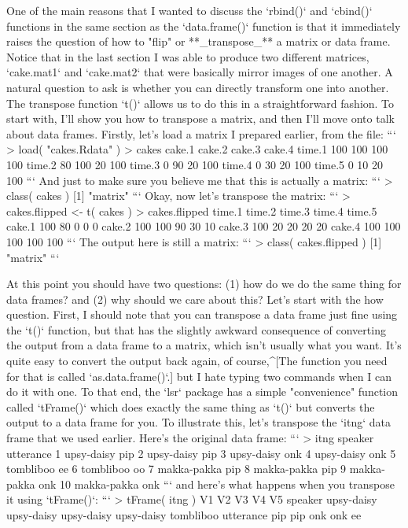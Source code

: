 One of the main reasons that I wanted to discuss the `rbind()` and `cbind()` functions in the same section as the `data.frame()` function is that it immediately raises the question of how to "flip" or **_transpose_** a matrix or data frame. Notice that in the last section I was able to produce two different matrices, `cake.mat1` and `cake.mat2` that were basically mirror images of one another. A natural question to ask is whether you can directly transform one into another. The transpose function `t()` allows us to do this in a straightforward fashion. To start with, I'll show you how to transpose a matrix, and then I'll move onto talk about data frames. Firstly, let's load a matrix I prepared earlier, from the  file:
```
> load( "cakes.Rdata" )
> cakes
       cake.1 cake.2 cake.3 cake.4
time.1    100    100    100    100
time.2     80    100     20    100
time.3      0     90     20    100
time.4      0     30     20    100
time.5      0     10     20    100
```
And just to make sure you believe me that this is actually a matrix:
```
> class( cakes )
[1] "matrix"
```
Okay, now let's transpose the matrix:
```
> cakes.flipped <- t( cakes )
> cakes.flipped
       time.1 time.2 time.3 time.4 time.5
cake.1    100     80      0      0      0
cake.2    100    100     90     30     10
cake.3    100     20     20     20     20
cake.4    100    100    100    100    100
```
The output here is still a matrix:
```
> class( cakes.flipped )
[1] "matrix"
```

At this point you should have two questions: (1) how do we do the same thing for data frames? and (2) why should we care about this? Let's start with the how question. First, I should note that you can transpose a data frame just fine using the `t()` function, but that has the slightly awkward consequence of converting the output from a data frame to a matrix, which isn't usually what you want. It's quite easy to convert the output back again, of course,^[The function you need for that is called `as.data.frame()`.] but I hate typing two commands when I can do it with one. To that end, the `lsr` package has a simple "convenience" function called `tFrame()` which does exactly the same thing as `t()` but converts the output to a data frame for you. To illustrate this, let's transpose the `itng` data frame that we used earlier. Here's the original data frame:
```
> itng
       speaker utterance
1   upsy-daisy       pip
2   upsy-daisy       pip
3   upsy-daisy       onk
4   upsy-daisy       onk
5    tombliboo        ee
6    tombliboo        oo
7  makka-pakka       pip
8  makka-pakka       pip
9  makka-pakka       onk
10 makka-pakka       onk
```
and here's what happens when you transpose it using `tFrame()`:
```
> tFrame( itng )
                  V1         V2         V3         V4        V5
speaker   upsy-daisy upsy-daisy upsy-daisy upsy-daisy tombliboo
utterance        pip        pip        onk        onk        ee

